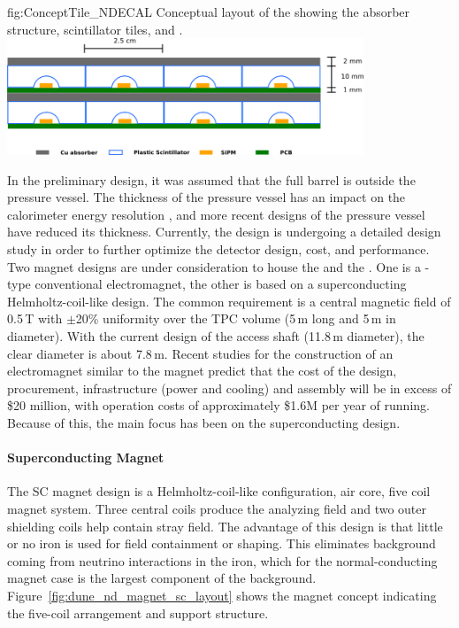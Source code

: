 \begin{dunefigure}[Conceptual layout of the \dshort{mpd} \dshort{ecal}] %
{fig:ConceptTile_NDECAL}
{Conceptual layout of the  showing the absorber structure, scintillator tiles,  and .}
\includegraphics[width=0.8\textwidth]{graphics/TileConcept.png}
\end{dunefigure}

In the preliminary design, it was assumed that the full  barrel is outside the pressure vessel.  The thickness of the pressure vessel has an impact on the calorimeter energy resolution \cite{Emberger:2018pgr}, and more recent designs of the pressure vessel have reduced its thickness.
Currently, the  design is undergoing a detailed design study in order to further optimize the detector design, cost, and performance.  
%
\label{sssec:nd:appx:mpd-magnet}
%
Two magnet designs are under consideration to house the  and the . One is a -type conventional electromagnet, the other is based on a superconducting Helmholtz-coil-like design. The common requirement is a central magnetic field of 0.5\,T with $\pm$20\% uniformity over the TPC volume (5\,m long and 5\,m in diameter). With the current design of the access shaft (11.8\,m diameter), the clear diameter is about 7.8\,m. Recent studies for the construction of an electromagnet similar to the  magnet predict that the cost of the design, procurement, infrastructure (power and cooling) and assembly will be in excess of \$20 million, with operation costs of approximately \$1.6M per year of running.  Because of this, the main focus has been on the superconducting design.
%
\paragraph{Superconducting Magnet}
%
The SC magnet design is a Helmholtz-coil-like configuration, air core,  five coil magnet system. Three central coils produce the analyzing field and two outer shielding coils help contain stray field. The advantage of this design is that little or no iron is used for field containment or shaping. This eliminates background coming from neutrino interactions in the iron, which for the normal-conducting magnet case is the largest component of the background. Figure~\ref{fig:dune_nd_magnet_sc_layout} shows the magnet concept indicating the five-coil arrangement and support structure. 

